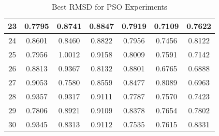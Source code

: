 \begin{table}
\begin{tabular}{ | c | c | c | c | c | c | c | }
		23 & 0.7795 & 0.8741 & 0.8847 & 0.7919 & 0.7109 & 0.7622 \\ \hline
		24 & 0.8601 & 0.8460 & 0.8822 & 0.7956 & 0.7456 & 0.8122 \\ \hline
		25 & 0.7956 & 1.0012 & 0.9158 & 0.8009 & 0.7591 & 0.7142 \\ \hline
		26 & 0.8813 & 0.9367 & 0.8132 & 0.8801 & 0.6765 & 0.6888 \\ \hline
		27 & 0.9053 & 0.7580 & 0.8559 & 0.8477 & 0.8089 & 0.6963 \\ \hline
		28 & 0.9357 & 0.9317 & 0.9111 & 0.7787 & 0.7570 & 0.7423 \\ \hline
		29 & 0.7806 & 0.8921 & 0.9109 & 0.8378 & 0.7654 & 0.7802 \\ \hline
		30 & 0.9345 & 0.8313 & 0.9112 & 0.7535 & 0.7615 & 0.8331 \\ \hline
	\end{tabular}
	\caption{Best RMSD for PSO Experiments}
	\label{table:appendix-pso-2}
\end{table}